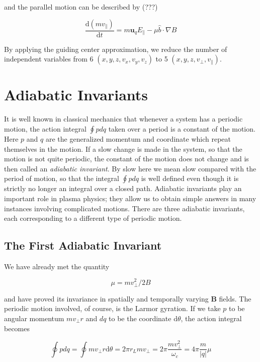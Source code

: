 \documentclass[
  notoc %
]{tufte-book}
\begin{document}
and the parallel motion can be described by (???)

\[
\frac{\mathrm{d}(mv_\parallel)}{\mathrm{d}t} = m\mathbf{u}_q E_\parallel - \mu\hat{b}\cdot\nabla B
\]

By applying the guiding center approximation, we reduce the number of
independent variables from 6 \((x,y,z,v_x,v_y,v_z)\) to 5
\((x,y,z,v_\perp, v_\parallel)\).

\hypertarget{adiabatic-invariants}{%
\section{Adiabatic Invariants}\label{adiabatic-invariants}}

It is well known in classical mechanics that whenever a system has a
periodic motion, the action integral \(\oint p dq\) taken over a period
is a constant of the motion. Here \(p\) and \(q\) are the generalized
momentum and coordinate which repeat themselves in the motion. If a slow
change is made in the system, so that the motion is not quite periodic,
the constant of the motion does not change and is then called an
\emph{adiabatic invariant}. By slow here we mean slow compared with the
period of motion, so that the integral \(\oint p dq\) is well defined
even though it is strictly no longer an integral over a closed path.
Adiabatic invariants play an important role in plasma physics; they
allow us to obtain simple answers in many instances involving
complicated motions. There are three adiabatic invariants, each
corresponding to a different type of periodic motion.

\hypertarget{the-first-adiabatic-invariant}{%
\subsection{The First Adiabatic
Invariant}\label{the-first-adiabatic-invariant}}

We have already met the quantity

\[
\mu = mv_\perp^2 / 2B
\]

and have proved its invariance in spatially and temporally varying
\(\mathbf{B}\) fields. The periodic motion involved, of course, is the
Larmor gyration. If we take \(p\) to be angular momentum \(mv_\perp r\)
and \(dq\) to be the coordinate \(\mathrm{d}\theta\), the action
integral becomes

\[
\oint p dq = \oint mv_\perp r \mathrm{d}\theta = 2\pi r_L m v_\perp = 2\pi \frac{mv_\perp^2}{\omega_c} = 4\pi \frac{m}{|q|}\mu
\]
\end{document}
